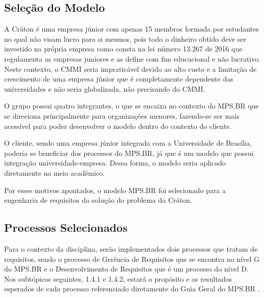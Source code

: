   \subsection{Seleção do Modelo}

    A Cráton é uma empresa júnior com apenas 15 membros formada por estudantes no qual
    não visam lucro para si mesmos, pois todo o dinheiro obtido deve ser investido
    na própria empresa como consta na lei número 13.267 de 2016 que regulamenta as empresas
    juniores e as define com fim educacional e não lucrativo. Neste contexto, o CMMI seria
    impraticável devido ao alto custo e a limitação de crescimento de uma empresa júnior que é
    completamente dependente das universidades e não seria globalizada, não precisando do CMMI.

    O grupo possui quatro integrantes, o que se encaixa no contexto do MPS.BR que se direciona
    principalmente para organizações menores, fazendo-se ser mais acessível para poder desenvolver
    o modelo dentro do contexto do cliente.

    O cliente, sendo uma empresa júnior integrada com a Universidade de Brasília, poderia se
    beneficiar dos processos do MPS.BR, já que é um modelo que possui integração universidade-empresa.
    Dessa forma, o modelo seria aplicado diretamente no meio acadêmico.

    Por esses motivos apontados, o modelo MPS.BR foi selecionado para a engenharia de requisitos da
    solução do problema da Cráton.

  \subsection{Processos Selecionados}

  Para o contexto da disciplina, serão implementados dois processos que tratam de
  requisitos, sendo o processo de Gerência de Requisitos que se encontra no nível
  G do MPS.BR e o Desenvolvimento de Requisitos que é um processo do nível D. Nos
  subtópicos seguintes, 1.4.1 e 1.4.2, estará o propósito e os resultados esperados
  de cada processo referenciado diretamente do Guia Geral do MPS.BR \cite{softexmps}.

